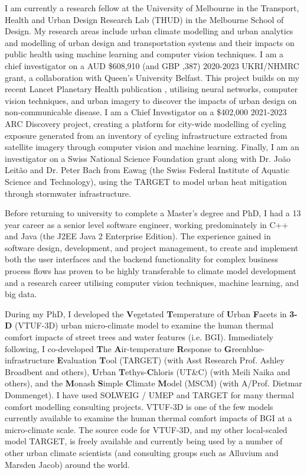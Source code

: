 I am currently a research fellow at the University of Melbourne in the Transport, Health and Urban Design Research Lab (THUD) in the Melbourne School of Design. My research areas include urban climate modelling and urban analytics and modelling of urban design and transportation systems and their impacts on public health using machine learning and computer vision techniques. I am a chief investigator on a AUD \$608,910 (and GBP ,387) 2020-2023 UKRI/NHMRC grant, a collaboration with Queen's University Belfast. This project builds on my recent Lancet Planetary Health publication \textbf{\cite{Thompson2020}}, utilising neural networks, computer vision techniques, and urban imagery to discover the impacts of urban design on non-communicable disease. I am a Chief Investigator on a \$402,000 2021-2023 ARC Discovery project, creating a platform for city-wide modelling of cycling exposure generated from an inventory of cycling infrastructure extracted from satellite imagery through computer vision and machine learning. Finally, I am an investigator on a Swiss National Science Foundation grant along with Dr. Jo\~{a}o Leit\~{a}o and Dr. Peter Bach from Eawag (the Swiss Federal Institute of Aquatic Science and Technology), using the TARGET to model urban heat mitigation through stormwater infrastructure.

Before returning to university to complete a Master's degree and PhD, I had a 13 year career as a senior level software engineer, working predominately in C++ and Java (the J2EE Java 2 Enterprise Edition). The experience gained in software design, development, and project management, to create and implement both the user interfaces and the backend functionality for complex business process flows has proven to be highly transferable to climate model development and a research career utilising computer vision techniques, machine learning, and big data.

During my PhD, I developed the \textbf{V}egetated \textbf{T}emperature of \textbf{U}rban \textbf{F}acets in \textbf{3-D} (VTUF-3D)\textbf{\cite{Nice2018a}} urban micro-climate model to examine the human thermal comfort impacts of street trees and water features (i.e. BGI). Immediately following, I co-developed \textbf{T}he \textbf{A}ir-temperature \textbf{R}esponse to \textbf{G}reenblue-infrastructure \textbf{E}valuation \textbf{T}ool (TARGET)\cite{Broadbent2019c} (with Asst Research Prof. Ashley Broadbent and others), \textbf{U}rban \textbf{T}ethys-\textbf{C}hloris (UT\&C)\textbf{\cite{Meili2020}} (with Meili Naika and others), and the \textbf{M}onash \textbf{S}imple \textbf{C}limate \textbf{M}odel\textbf{\cite{Dommenget2019}} (MSCM) (with A/Prof. Dietmar Dommenget). I have used SOLWEIG / UMEP\cite{Lindberg2018} and TARGET for many thermal comfort modelling consulting projects. VTUF-3D is one of the few models currently available to examine the human thermal comfort impacts of BGI at a micro-climate scale. The source code for VTUF-3D, and my other local-scaled model TARGET, is freely available and currently being used by a number of other urban climate scientists (and consulting groups such as Alluvium\cite{MosiacInsights2020} and Marsden Jacob) around the world. 

